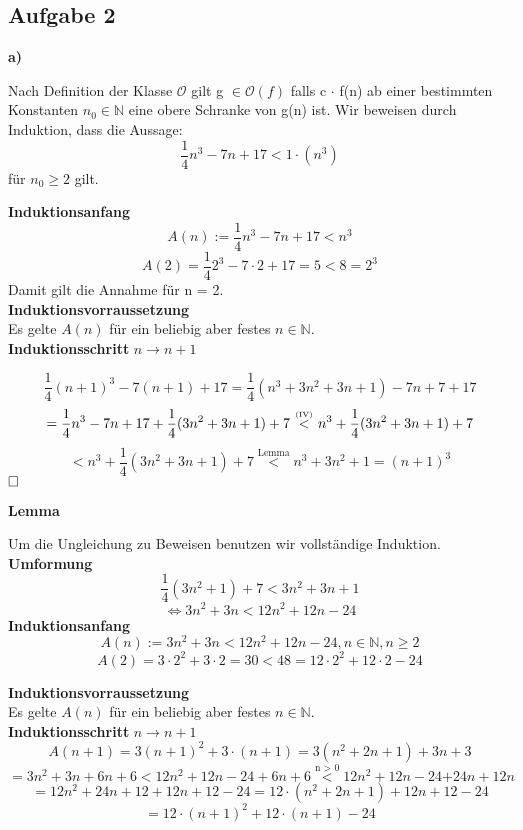 \documentclass[a4paper,graphics,11pt]{article}
\newcommand{\aufgabe}[1]{\subsection*{Aufgabe #1}}
\newcommand{\up}[2]{\mathrel{\overset{\makebox[0pt]{\mbox{\normalfont\tiny #2}}}{#1}}}
\begin{document}
\aufgabe{2} 
\textbf{a)}

Nach Definition der Klasse $\mathcal{O}$ gilt g $\in \mathcal{O}(f)$ falls c $\cdot$ f(n) ab einer bestimmten Konstanten $n_0 \in \mathbb{N}$ eine obere Schranke von g(n) ist. Wir beweisen durch Induktion, dass die Aussage:
$$
	\frac{1}{4}n^3-7n+17 < 1\cdot(n^3)
$$
für $n_0 \ge 2$ gilt.\\

\begin{minipage}{1\linewidth}
	\textbf{Induktionsanfang}\\
	$$
		A(n) := \frac{1}{4}n^3-7n+17 < n^3  
	$$$$
		A(2) = \frac{1}{4} 2^3-7\cdot2+17 = 5 < 8 = 2^3
	$$
	Damit gilt die Annahme für n = 2.\\
	
	\textbf{Induktionsvorraussetzung}\\
	
	Es gelte $A(n)$ für ein beliebig aber festes $n \in \mathbb{N}$.\\
	
	\textbf{Induktionsschritt} $n \to n+1$
	
	$$
	\frac{1}{4}(n+1)^3-7(n+1)+17 = \frac{1}{4}(n^3+3n^2+3n+1)-7n+7+17
	$$$$
	=\frac{1}{4}n^3-7n+17+\frac{1}{4}(3n^2+3n+1)+7\ \up{<}{(IV)}\ n^3+\frac{1}{4}(3n^2+3n+1)+7
	$$$$
	< n^3+\frac{1}{4}(3n^2+3n+1)+7 \overset{\text{Lemma}}{<} n^3 +3n^2+1 = (n+1)^3
	$$
	$\hfill\square$\\
	
\end{minipage}


	\textbf{Lemma}
	
	Um die Ungleichung zu Beweisen benutzen wir vollständige Induktion.\\
	
	\textbf{Umformung}
	$$
	\frac{1}{4}(3n^2+1)+7 < 3n^2+3n+1 
	$$$$
	\Leftrightarrow 3n^2 + 3n < 12n^2+12n-24
	$$
	\textbf{Induktionsanfang}
	$$
	A(n) := 3n^2+3n < 12n^2+12n-24 , n \in \mathbb{N}, n\geq 2
	$$$$
	A(2) = 3 \cdot 2^2+3\cdot 2 = 30 < 48 = 12 \cdot 2^2+12 \cdot 2-24
	$$
	
	\newpage
	
	\textbf{Induktionsvorraussetzung}\\
	
	Es gelte $A(n)$ für ein beliebig aber festes $n \in \mathbb{N}$.\\
	
	\textbf{Induktionsschritt} $n \to n+1$
	$$
	A(n+1) = 3(n+1)^2 + 3 \cdot (n+1) = 3(n^2 + 2n + 1) + 3n + 3
	$$$$
	= 3n^2 + 3n + 6n +6 < 12n^2 + 12n - 24 + 6n + 6 \overset{\text{n > 0}}{<} 12n^2 + 12n - 24 \textbf{+} 24n + 12n
	$$$$
	=12n^2 + 24n + 12 +12n + 12 - 24 = 12 \cdot (n^2 + 2n + 1) + 12n +12 -24 
	$$$$
	= 12 \cdot (n+1)^2 + 12 \cdot (n+1) -24
	$$
	
\end{document}
